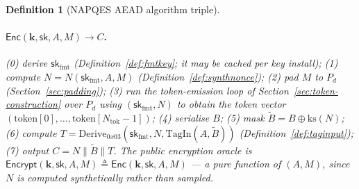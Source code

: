 \documentclass[11pt,a4paper]{article}
\newtheorem{definition}[theorem]{Definition}
\begin{document}
\begin{definition}[NAPQES AEAD algorithm triple]
\paragraph{$\mathsf{Enc}(\mathbf{k}, \mathsf{sk}, A, M) \to C$.}
(0) derive $\mathsf{sk}_{\mathrm{fmt}}$
(Definition~\ref{def:fmtkey}; it may be cached per key install); (1) compute $N=N(\mathsf{sk}_{\mathrm{fmt}},A,M)$
(Definition~\ref{def:synthnonce}); (2) pad $M$ to $P_d$
(Section~\ref{sec:padding}); (3) run the token-emission loop of
Section~\ref{sec:token-construction} over $P_d$ using
$(\mathsf{sk}_{\mathrm{fmt}},N)$ to obtain the token vector
$(\mathrm{token}[0],\ldots,\mathrm{token}[N_{\mathrm{tok}}-1])$; (4)
serialise $B$; (5) mask $\widetilde{B}=B\oplus\mathrm{ks}(N)$; (6) compute
$T=\mathrm{Derive}_{0x03}(\mathsf{sk}_{\mathrm{fmt}},N,\mathrm{TagIn}(A,\widetilde{B}))$
(Definition~\ref{def:taginput});
(7) output $C=N\|\widetilde{B}\|T$. The public encryption oracle is
$\mathsf{Encrypt}(\mathbf{k},\mathsf{sk},A,M)\triangleq\mathsf{Enc}(\mathbf{k},\mathsf{sk},A,M)$
— a \emph{pure function} of $(A,M)$, since $N$ is computed synthetically
rather than sampled.


\end{definition}
\end{document}
